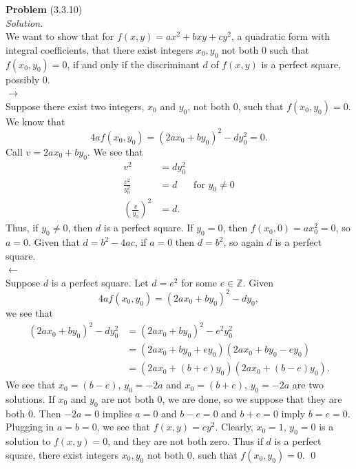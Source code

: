 \documentclass[12 pt]{amsart}
\begin{document}
\phantom{\quad} \vfill
\noindent
\textbf{Problem} (3.3.10) \\[4ex]
\emph{Solution.} \\[2ex]
  We want to show that for
  $f(x,y) = ax^2 + bxy + cy^2$, 
  a quadratic form with integral coefficients,
  that there exist integers
  $x_0, y_0$ not both 0 such that 
  $f(x_0, y_0) = 0$,
  if and only if the discriminant $d$ of $f(x,y)$
  is a perfect square, possibly 0. \\

  \noindent
  $\longrightarrow$ \\
  Suppose there exist two integers, 
  $x_0$ and $y_0$, not both 0, such that
  $f(x_0, y_0) = 0$.
  We know that 
  \[
    4af(x_0, y_0) =  (2ax_0 + by_0)^2 - dy^2_0 = 0.
  \]
  Call $v = 2ax_0 + by_0$.
  We see that 
  \begin{align*}
    v^2 &= dy_0^2 \\
    \frac{v^2}{y_0^2} &= d & \text{for $y_0 \neq 0$} \\
    \left( \frac{v}{y_0} \right)^2 &= d.
  \end{align*}
  Thus, if $y_0 \neq 0$, then $d$ is a perfect square.
  If $y_0 = 0$, then
  $f(x_0, 0) = ax_0^2 = 0$, so $a = 0$.
  Given that $d = b^2 - 4ac$, if $a = 0$ then
  $d = b^2$, so again $d$ is a perfect square. \\

  \noindent
  $\longleftarrow$ \\
  Suppose $d$ is a perfect square.
  Let $d = e^2$ for some $e \in \mathbb{Z}$.
  Given 
  \[
    4af(x_0, y_0) =  (2ax_0 + by_0)^2 - dy_0,
  \]
  we see that 
  \begin{align*}
    (2ax_0 + by_0)^2 - dy^2_0 
      &= (2ax_0 + by_0)^2 - e^2y^2_0 \\
      &= (2ax_0 + by_0 + ey_0)(2ax_0 + by_0 - ey_0) \\
      &= (2ax_0 + (b+e)y_0)(2ax_0 + (b-e)y_0). 
  \end{align*}
  We see that 
  $x_0 = (b-e)$, $y_0 = -2a$ 
  and
  $x_0 = (b+e)$, $y_0 = -2a$ 
  are two solutions.
  If $x_0$ and $y_0$ are not both 0, we are done, so we suppose
  that they are both 0.
  Then $-2a = 0$ implies $a = 0$ and 
  $b-e = 0$ and $b + e = 0$ imply $b = e = 0$.
  Plugging in $a = b = 0$, we see that
  $f(x,y) = cy^2$.
  Clearly, $x_0 = 1$, $y_0 = 0$ is a solution to
  $f(x,y) = 0$, and they are not both zero.
  Thus if $d$ is a perfect square, there exist integers
  $x_0, y_0$ not both 0, such that $f(x_0, y_0) = 0$.
  \qed
\vfill
\newpage
\end{document}
